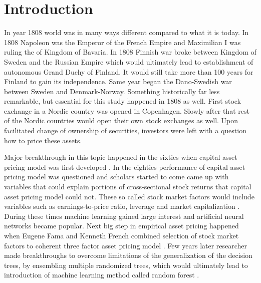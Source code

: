 \documentclass{article}
\begin{document}
\section{Introduction} \label{Introduction}
In year 1808 world was in many ways different compared to what it is today. In 1808 Napoleon was the Emperor of the French Empire and Maximilian I was ruling the of Kingdom of Bavaria. In 1808 Finnish war broke between Kingdom of Sweden and the Russian Empire which would ultimately lead to establishment of autonomous Grand Duchy of Finland. It would still take more than 100 years for Finland to gain its independence. Same year began the Dano-Swedish war between Sweden and Denmark-Norway. Something historically far less remarkable, but essential for this study happened in 1808 as well. First stock exchange in a Nordic country was opened in Copenhagen\footnotemark. Slowly after that rest of the Nordic countries would open their own stock exchanges as well. Upon facilitated change of ownership of securities, investors were left with a question how to price these assets. \par


Major breakthrough in this topic happened in the sixties when capital asset pricing model was first developed \cite{Sharpe1964, Lintner1965}. In the eighties performance of capital asset pricing model was questioned and scholars started to come came up with variables that could explain portions of cross-sectional stock returns that capital asset pricing model could not. These so called stock market factors would include variables such as earnings-to-price ratio, leverage and market capitalization \cite{Basu1977, Bhandari1988, BANZ1981}. During these times machine learning gained large interest and artificial neural networks became popular. Next big step in empirical asset pricing happened when Eugene Fama and Kenneth French combined selection of stock market factors to coherent three factor asset pricing model \cite{FAMA19933}. Few years later researcher made breakthroughs to overcome limitations of the generalization of the decision trees, by ensembling multiple randomized trees, which would ultimately lead to introduction of machine learning method called random forest \cite{Ho1995, Breiman20015}. \par
\end{document}
